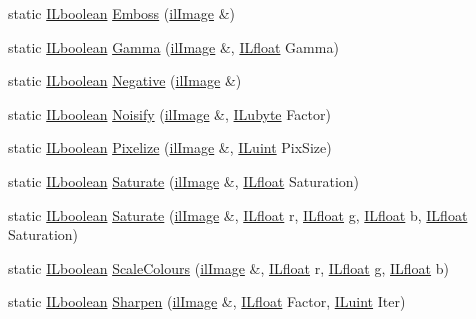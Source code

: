 \begin{DoxyCompactItemize}
static \hyperlink{il_8h_a8be80d75c2c636b9f2250fe10c2e7874}{I\-Lboolean} \hyperlink{classil_filters_adadb8ea19a14ffebe47a2b5333bd372c}{Emboss} (\hyperlink{classil_image}{il\-Image} \&)
\item 
static \hyperlink{il_8h_a8be80d75c2c636b9f2250fe10c2e7874}{I\-Lboolean} \hyperlink{classil_filters_ae3eb488f18587a3cecb7080d761b5c07}{Gamma} (\hyperlink{classil_image}{il\-Image} \&, \hyperlink{il_8h_a0576415379485bafa4b5f61989797b5e}{I\-Lfloat} Gamma)
\item 
static \hyperlink{il_8h_a8be80d75c2c636b9f2250fe10c2e7874}{I\-Lboolean} \hyperlink{classil_filters_aa10ffb82b1e214e80338fb1f34816335}{Negative} (\hyperlink{classil_image}{il\-Image} \&)
\item 
static \hyperlink{il_8h_a8be80d75c2c636b9f2250fe10c2e7874}{I\-Lboolean} \hyperlink{classil_filters_a363a530d001b264b9ef4069435a04878}{Noisify} (\hyperlink{classil_image}{il\-Image} \&, \hyperlink{il_8h_a8d2f04500100a86d1b00e98ab1b15a33}{I\-Lubyte} Factor)
\item 
static \hyperlink{il_8h_a8be80d75c2c636b9f2250fe10c2e7874}{I\-Lboolean} \hyperlink{classil_filters_a70c5f8b9dfa6c1c87e2a4fd105ec98f1}{Pixelize} (\hyperlink{classil_image}{il\-Image} \&, \hyperlink{il_8h_ac6508d0e9c19e32f32e00d54b5b8cf30}{I\-Luint} Pix\-Size)
\item 
static \hyperlink{il_8h_a8be80d75c2c636b9f2250fe10c2e7874}{I\-Lboolean} \hyperlink{classil_filters_a3faeb9d0009bb0082648669ee5c70533}{Saturate} (\hyperlink{classil_image}{il\-Image} \&, \hyperlink{il_8h_a0576415379485bafa4b5f61989797b5e}{I\-Lfloat} Saturation)
\item 
static \hyperlink{il_8h_a8be80d75c2c636b9f2250fe10c2e7874}{I\-Lboolean} \hyperlink{classil_filters_a446d64f549dd1b2ca4e4b2702e23f64b}{Saturate} (\hyperlink{classil_image}{il\-Image} \&, \hyperlink{il_8h_a0576415379485bafa4b5f61989797b5e}{I\-Lfloat} r, \hyperlink{il_8h_a0576415379485bafa4b5f61989797b5e}{I\-Lfloat} g, \hyperlink{il_8h_a0576415379485bafa4b5f61989797b5e}{I\-Lfloat} b, \hyperlink{il_8h_a0576415379485bafa4b5f61989797b5e}{I\-Lfloat} Saturation)
\item 
static \hyperlink{il_8h_a8be80d75c2c636b9f2250fe10c2e7874}{I\-Lboolean} \hyperlink{classil_filters_a5b4e454858c4e2a5f11ac76927825c0b}{Scale\-Colours} (\hyperlink{classil_image}{il\-Image} \&, \hyperlink{il_8h_a0576415379485bafa4b5f61989797b5e}{I\-Lfloat} r, \hyperlink{il_8h_a0576415379485bafa4b5f61989797b5e}{I\-Lfloat} g, \hyperlink{il_8h_a0576415379485bafa4b5f61989797b5e}{I\-Lfloat} b)
\item 
static \hyperlink{il_8h_a8be80d75c2c636b9f2250fe10c2e7874}{I\-Lboolean} \hyperlink{classil_filters_a172e3380bca8137f1db17724592520ea}{Sharpen} (\hyperlink{classil_image}{il\-Image} \&, \hyperlink{il_8h_a0576415379485bafa4b5f61989797b5e}{I\-Lfloat} Factor, \hyperlink{il_8h_ac6508d0e9c19e32f32e00d54b5b8cf30}{I\-Luint} Iter)
\end{DoxyCompactItemize}


